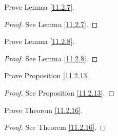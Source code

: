 \exercisesection

\begin{exercise}\label{ex 11.2.1}
    Prove Lemma \ref{11.2.7}.
\end{exercise}

\begin{proof}
    See Lemma \ref{11.2.7}.
\end{proof}

\begin{exercise}\label{ex 11.2.2}
    Prove Lemma \ref{11.2.8}.
\end{exercise}

\begin{proof}
    See Lemma \ref{11.2.8}.
\end{proof}

\begin{exercise}\label{ex 11.2.3}
    Prove Proposition \ref{11.2.13}.
\end{exercise}

\begin{proof}
    See Proposition \ref{11.2.13}.
\end{proof}

\begin{exercise}\label{ex 11.2.4}
    Prove Theorem \ref{11.2.16}.
\end{exercise}

\begin{proof}
    See Theorem \ref{11.2.16}.
\end{proof}